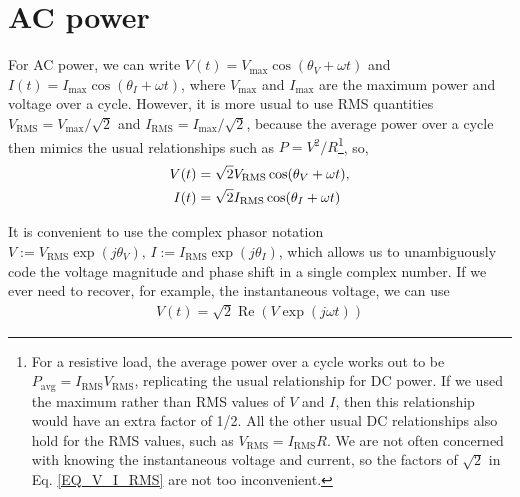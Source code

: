 \documentclass[11pt]{article}
\newcommand{\re}[1]{\ensuremath{\operatorname{Re}(#1)}}
\begin{document}
\section{AC power}
For AC power, we can write $V(t) = V_\text{max} \cos(\theta_V + \omega t)$ and $I(t) = I_\text{max} \cos(\theta_I + \omega t)$, where $V_\text{max}$ and $I_\text{max}$ are the maximum power and voltage over a cycle. However, it is more usual to use RMS quantities $V_\text{RMS} = V_\text{max}/\sqrt{2}$ and $I_\text{RMS} = I_\text{max}/\sqrt{2}$, because the average power over a cycle then mimics the usual relationships such as $P = V^2/R$\footnote{For a resistive load, the average power over a cycle works out to be $P_\text{avg} = I_\text{RMS}V_\text{RMS}$, replicating the usual relationship for DC power. If we used the maximum rather than RMS values of $V$ and $I$, then this relationship would have an extra factor of 1/2. All the other usual DC relationships also hold for the RMS values, such as $V_\text{RMS} = I_\text{RMS}R$. We are not often concerned with knowing the instantaneous voltage and current, so the factors of $\sqrt{2}$ in Eq. \ref{EQ_V_I_RMS} are not too inconvenient.}, so,
\begin{align}
	V(t) &= \sqrt{2}V_\text{RMS} \cos(\theta_V + \omega t), \notag \\
	I(t) &= \sqrt{2}I_\text{RMS} \cos(\theta_I + \omega t)
	\label{EQ_V_I_RMS}
\end{align}

It is convenient to use the complex phasor notation $V := V_\text{RMS} \exp(j\theta_V), \, I := I_\text{RMS} \exp(j\theta_I)$, which allows us to unambiguously code the voltage magnitude and phase shift in a single complex number. If we ever need to recover, for example, the instantaneous voltage, we can use
\begin{align}
	V(t) = \sqrt{2}\re{V \exp(j\omega t)}
\end{align}
\end{document}
